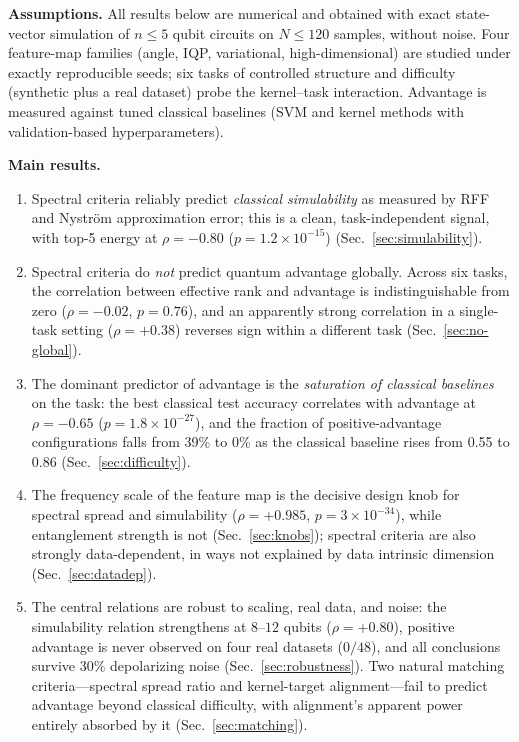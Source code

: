 \documentclass[aps,pra,preprint]{revtex4-2}
\begin{document}
\textbf{Assumptions.} All results below are numerical and obtained with exact
state-vector simulation of $n\le5$ qubit circuits on $N\le120$ samples, without noise.
Four feature-map families (angle, IQP, variational, high-dimensional) are studied under
exactly reproducible seeds; six tasks of controlled structure and difficulty
(synthetic plus a real dataset) probe the kernel--task interaction. Advantage is
measured against tuned classical baselines (SVM and kernel methods with validation-based
hyperparameters).

\textbf{Main results.}
\begin{enumerate}
\item Spectral criteria reliably predict \emph{classical simulability} as measured by
RFF and Nystr\"om approximation error; this is a clean, task-independent signal, with
top-5 energy at $\rho=-0.80$ ($p=1.2\times10^{-15}$) (Sec.~\ref{sec:simulability}).
\item Spectral criteria do \emph{not} predict quantum advantage globally. Across six
tasks, the correlation between effective rank and advantage is indistinguishable from
zero ($\rho=-0.02$, $p=0.76$), and an apparently strong correlation in a single-task
setting ($\rho=+0.38$) reverses sign within a different task (Sec.~\ref{sec:no-global}).
\item The dominant predictor of advantage is the \emph{saturation of classical
baselines} on the task: the best classical test accuracy correlates with advantage at
$\rho=-0.65$ ($p=1.8\times10^{-27}$), and the fraction of positive-advantage
configurations falls from 39\% to 0\% as the classical baseline rises from 0.55 to
0.86 (Sec.~\ref{sec:difficulty}).
\item The frequency scale of the feature map is the decisive design knob for spectral
spread and simulability ($\rho=+0.985$, $p=3\times10^{-34}$), while entanglement
strength is not (Sec.~\ref{sec:knobs}); spectral criteria are also strongly
data-dependent, in ways not explained by data intrinsic dimension
(Sec.~\ref{sec:datadep}).
\item The central relations are robust to scaling, real data, and noise: the
simulability relation strengthens at $8$--$12$ qubits ($\rho=+0.80$), positive advantage
is never observed on four real datasets ($0/48$), and all conclusions survive $30\%$
depolarizing noise (Sec.~\ref{sec:robustness}). Two natural matching criteria---spectral
spread ratio and kernel-target alignment---fail to predict advantage beyond classical
difficulty, with alignment's apparent power entirely absorbed by it
(Sec.~\ref{sec:matching}).
\end{enumerate}
\end{document}
